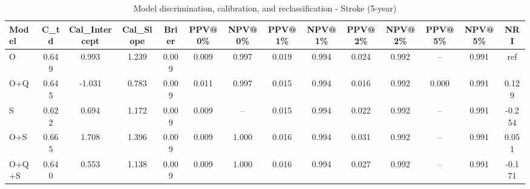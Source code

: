 \begin{table}[htbp]
\centering
\small
\caption{Model discrimination, calibration, and reclassification - Stroke (5-year)}
\label{tab:perf_stroke_5y}
\begin{tabular}{lccccccccccccc}
\toprule
Model & C\_td & Cal\_Intercept & Cal\_Slope & Brier & PPV@0\% & NPV@0\% & PPV@1\% & NPV@1\% & PPV@2\% & NPV@2\% & PPV@5\% & NPV@5\% & NRI \\
\midrule
O & 0.649 & 0.993 & 1.239 & 0.009 & 0.009 & 0.997 & 0.019 & 0.994 & 0.024 & 0.992 & -- & 0.991 & ref \\
O+Q & 0.645 & -1.031 & 0.783 & 0.009 & 0.011 & 0.997 & 0.015 & 0.994 & 0.016 & 0.992 & 0.000 & 0.991 & 0.129 \\
S & 0.622 & 0.694 & 1.172 & 0.009 & 0.009 & -- & 0.015 & 0.994 & 0.022 & 0.992 & -- & 0.991 & -0.254 \\
O+S & 0.665 & 1.708 & 1.396 & 0.009 & 0.009 & 1.000 & 0.016 & 0.994 & 0.031 & 0.992 & -- & 0.991 & 0.051 \\
O+Q+S & 0.640 & 0.553 & 1.138 & 0.009 & 0.009 & 1.000 & 0.016 & 0.994 & 0.027 & 0.992 & -- & 0.991 & -0.171 \\
\bottomrule
\end{tabular}
\end{table}